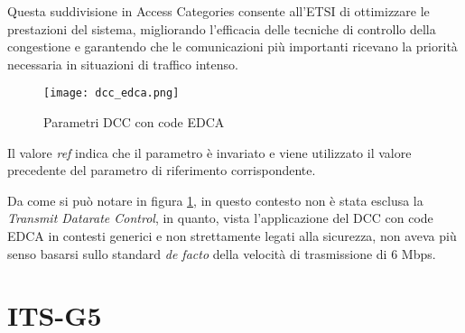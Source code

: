 Questa suddivisione in Access Categories consente all'ETSI di ottimizzare le prestazioni del sistema, migliorando l'efficacia delle tecniche di controllo della congestione e garantendo che le comunicazioni più importanti ricevano la priorità necessaria in situazioni di traffico intenso.

\begin{figure}[h!]
    \centering
    \texttt{[image: dcc\_edca.png]}
    \caption{Parametri DCC con code EDCA}
    \label{fig:dcc_edca}
\end{figure}

Il valore \textit{ref} indica che il parametro è invariato e viene utilizzato il valore precedente del parametro di riferimento corrispondente.

Da come si può notare in figura \ref{fig:dcc_edca}, in questo contesto non è stata esclusa la \textit{Transmit Datarate Control}, in quanto, vista l'applicazione del DCC con code EDCA in contesti generici e non strettamente legati alla sicurezza, non aveva più senso basarsi sullo standard \textit{de facto} della velocità di trasmissione di 6 Mbps.

\section{ITS-G5}
